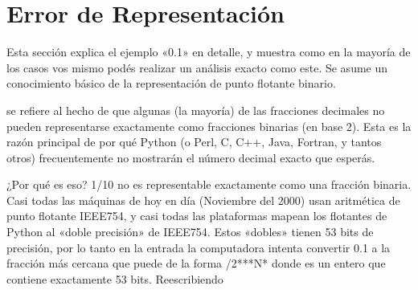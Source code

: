 \documentclass[a4,10pt,spanish]{sphinxmanual}
\begin{document}
\begin{sphinxVerbatim}[commandchars=\\\{\}]
\PYG{p}{[}\PYG{p}{]}    
\PYG{p}{[}\PYG{p}{]}    
\end{sphinxVerbatim}


\section{Error de Representación}
\label{\detokenize{tutorial/floatingpoint:representation-error}}\label{\detokenize{tutorial/floatingpoint:tut-fp-error}}
\sphinxAtStartPar
Esta sección explica el ejemplo «0.1» en detalle, y muestra como en la mayoría de los casos vos mismo podés realizar un análisis exacto como este. Se asume un conocimiento básico de la representación de punto flotante binario.

\sphinxAtStartPar
{} se refiere al hecho de que algunas (la mayoría) de las fracciones decimales no pueden representarse exactamente como fracciones binarias (en base 2).  Esta es la razón principal de por qué Python (o Perl, C, C++, Java, Fortran, y tantos otros) frecuentemente no mostrarán el número decimal exacto que esperás.

\sphinxAtStartPar
¿Por qué es eso?  1/10 no es representable exactamente como una fracción binaria.  Casi todas las máquinas de hoy en día (Noviembre del 2000) usan aritmética de punto flotante IEEE\sphinxhyphen{}754, y casi todas las plataformas mapean los flotantes de Python al «doble precisión» de IEEE\sphinxhyphen{}754.  Estos «dobles» tienen 53 bits de precisión, por lo tanto en la entrada la computadora intenta convertir 0.1 a la fracción más cercana que puede de la forma /2***N* donde  es un entero que contiene exactamente 53 bits. Reescribiendo

\begin{sphinxVerbatim}[commandchars=\\\{\}]
      
\end{sphinxVerbatim}
\end{document}
